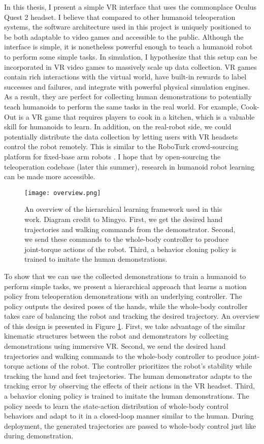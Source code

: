 In this thesis, I present a simple VR interface that uses the commonplace Oculus Quest 2 headset. I believe that compared to other humanoid teleoperation systems, the software architecture used in this project is uniquely positioned to be both adaptable to video games and accessible to the public. Although the interface is simple, it is nonetheless powerful enough to teach a humanoid robot to perform some simple tasks. In simulation, I hypothesize that this setup can be incorporated in VR video games to massively scale up data collection. VR games contain rich interactions with the virtual world, have built-in rewards to label successes and failures, and integrate with powerful physical simulation engines. As a result, they are perfect for collecting human demonstrations to potentially teach humanoids to perform the same tasks in the real world. For example, Cook-Out is a VR game that requires players to cook in a kitchen, which is a valuable skill for humanoids to learn. In addition, on the real-robot side, we could potentially distribute the data collection by letting users with VR headsets control the robot remotely. This is similar to the RoboTurk crowd-sourcing platform for fixed-base arm robots \cite{mandlekar2018roboturk}. I hope that by open-sourcing the teleoperation codebase (later this summer), research in humanoid robot learning can be made more accessible. 

\begin{figure}
    \centering
    \texttt{[image: overview.png]}
    \caption{An overview of the hierarchical learning framework used in this work. Diagram credit to Mingyo. First, we get the desired hand trajectories and walking commands from the demonstrator. Second, we send these commands to the whole-body controller to produce joint-torque actions of the robot. Third, a behavior cloning policy is trained to imitate the human demonstrations. }
    \label{fig:overview}
\end{figure}

To show that we can use the collected demonstrations to train a humanoid to perform simple tasks, we present a hierarchical approach that learns a motion policy from teleoperation demonstrations with an underlying controller. The policy outputs the desired poses of the hands, while the whole-body controller takes care of balancing the robot and tracking the desired trajectory. An overview of this design is presented in Figure \ref{fig:overview}.
First, we take advantage of the similar kinematic structures between the robot and demonstrators by collecting demonstrations using immersive VR. Second, we send the desired hand trajectories and walking commands to the whole-body controller to produce joint-torque actions of the robot. The controller prioritizes the robot's stability while tracking the hand and feet trajectories. The human demonstrator adapts to the tracking error by observing the effects of their actions in the VR headset. Third, a behavior cloning policy is trained to imitate the human demonstrations. The policy needs to learn the state-action distribution of whole-body control behaviors and adapt to it in a closed-loop manner similar to the human. During deployment, the generated trajectories are passed to whole-body control just like during demonstration.

